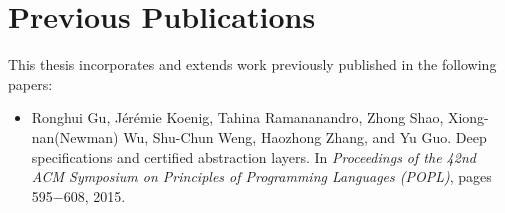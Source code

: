 

\chapter*{Previous Publications}
\thispagestyle{empty}

This thesis incorporates and extends work previously
published in the following papers:

\begin{itemize}

\item 
Ronghui Gu, J\'{e}r\'{e}mie Koenig, Tahina Ramananandro, Zhong Shao, Xiong-
nan(Newman) Wu, Shu-Chun Weng, Haozhong Zhang, and Yu Guo. Deep
specifications and certified abstraction layers. In {\em Proceedings of the 42nd ACM Symposium
on Principles of Programming Languages (POPL)}, pages 595$-$608, 2015.~\cite{dscal15}

\end{itemize}

\clearpage
